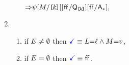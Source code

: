 \begin{definition}
\begin{multicols}{2}
\begin{enumerate}[topsep=0pt,label=(\textsc{w}\arabic*),ref=\textsc{w}\arabic*]
\begin{enumerate}[leftmargin=0pt]
{\begin{math}
          \mathbin{\Rightarrow} 
          \psi
          [M/\mkern-0mu\texttt{[}\mkern-2muk \mkern-2mu\texttt{]}\mkern-0mu]
          [\mkern.6mu\mathsf{ff}\mkern.6mu/\mathsf{Q}_{\mkern-0mu\texttt{[}\mkern-2muk \mkern-2mu\texttt{]}\mkern-0mu}]
          [\mkern.6mu\mathsf{ff}\mkern.6mu/\mathsf{A}_{{\ast}}],
        \end{math}}
      \end{enumerate}
      \columnbreak
    \item[] 
      \begin{enumerate}[leftmargin=0pt]
      \item \label{write-term-nonempty-addr}
        if $E\neq\emptyset$ then $\aTerm \riff \cExp{=}\cVal \land \aExp{=}\aVal$,
      \item \label{write-term-empty-addr}
        if $E=\emptyset$ then $\aTerm \riff \FALSE$.
      \end{enumerate}
    \end{enumerate}
  \end{multicols}


\end{definition}
